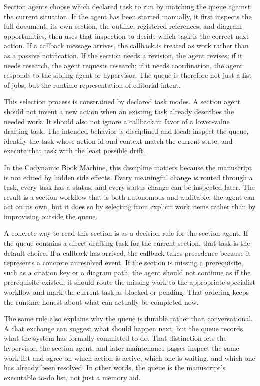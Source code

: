 Section agents choose which declared task to run by matching the queue against the current situation. If the agent has been started manually, it first inspects the full document, its own section, the outline, registered references, and diagram opportunities, then uses that inspection to decide which task is the correct next action. If a callback message arrives, the callback is treated as work rather than as a passive notification. If the section needs a revision, the agent revises; if it needs research, the agent requests research; if it needs coordination, the agent responds to the sibling agent or hypervisor. The queue is therefore not just a list of jobs, but the runtime representation of editorial intent.

This selection process is constrained by declared task modes. A section agent should not invent a new action when an existing task already describes the needed work. It should also not ignore a callback in favor of a lower-value drafting task. The intended behavior is disciplined and local: inspect the queue, identify the task whose action id and context match the current state, and execute that task with the least possible drift.

In the Codynamic Book Machine, this discipline matters because the manuscript is not edited by hidden side effects. Every meaningful change is routed through a task, every task has a status, and every status change can be inspected later. The result is a section workflow that is both autonomous and auditable: the agent can act on its own, but it does so by selecting from explicit work items rather than by improvising outside the queue.

A concrete way to read this section is as a decision rule for the section agent. If the queue contains a direct drafting task for the current section, that task is the default choice. If a callback has arrived, the callback takes precedence because it represents a concrete unresolved event. If the section is missing a prerequisite, such as a citation key or a diagram path, the agent should not continue as if the prerequisite existed; it should route the missing work to the appropriate specialist workflow and mark the current task as blocked or pending. That ordering keeps the runtime honest about what can actually be completed now.

The same rule also explains why the queue is durable rather than conversational. A chat exchange can suggest what should happen next, but the queue records what the system has formally committed to do. That distinction lets the hypervisor, the section agent, and later maintenance passes inspect the same work list and agree on which action is active, which one is waiting, and which one has already been resolved. In other words, the queue is the manuscript's executable to-do list, not just a memory aid.

